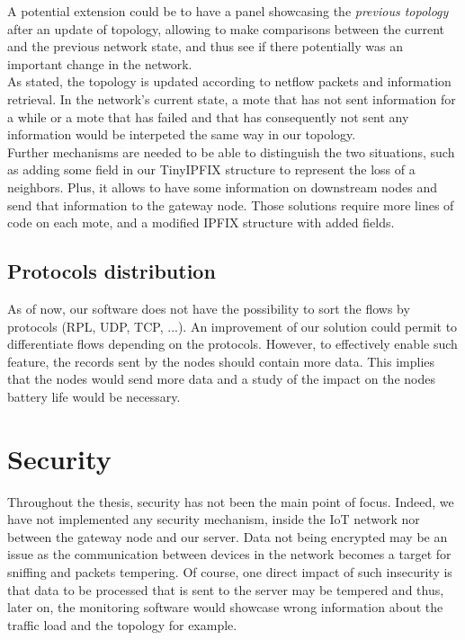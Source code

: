 A potential extension could be to have a panel showcasing the \textit{previous topology} after an update of topology, allowing to make comparisons between the current and the previous network state, and thus see if there potentially was an important change in the network.\\

As stated, the topology is updated according to netflow packets and information retrieval. In the network's current state, a mote that has not sent information for a while or a mote that has failed and that has consequently not sent any information would be interpeted the same way in our topology. \\

Further mechanisms are needed to be able to distinguish the two situations, such as adding some field in our TinyIPFIX structure to represent the loss of a neighbors. Plus, it allows to have some information on downstream nodes and send that information to the gateway node. Those solutions require more lines of code on each mote, and a modified IPFIX structure with added fields.

\subsection{Protocols distribution}

As of now, our software does not have the possibility to sort the flows by protocols (RPL, UDP, TCP, ...). An improvement of our solution could permit to differentiate flows depending on the protocols. However, to effectively enable such feature, the records sent by the nodes should contain more data. This implies that the nodes would send more data and a study of the impact on the nodes battery life would be necessary.

\section{Security}

Throughout the thesis, security has not been the main point of focus. Indeed, we have not implemented any security mechanism, inside the IoT network nor between the gateway node and our server. Data not being encrypted may be an issue as the communication between devices in the network becomes a target for sniffing and packets tempering. Of course, one direct impact of such insecurity is that data to be processed that is sent to the server may be tempered and thus, later on, the monitoring software would showcase wrong information about the traffic load and the topology for example.\\

